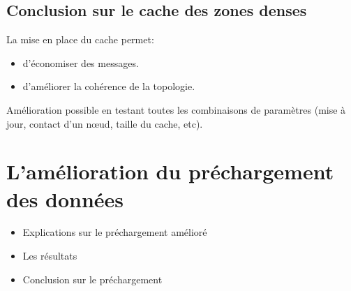 \documentclass{beamer}
\begin{document}
  \subsection{Conclusion sur le cache des zones denses}
  \begin{frame}
  	La mise en place du cache permet:\\
	\begin{itemize}
		\item d'économiser des messages.\\
		\item d'améliorer la cohérence de la topologie.\\
	\end{itemize}
	\vspace{5mm}
	Amélioration possible en testant toutes les combinaisons de paramètres (mise à jour, contact d'un nœud, taille du cache, etc).\\
  \end{frame}



  \section{L'amélioration du préchargement des données}
  \begin{frame}
	\vspace{1cm}
	\begin{itemize}
		\item Explications sur le préchargement amélioré
		\item Les résultats 
		\item Conclusion sur le préchargement
	\end{itemize}
  \end{frame}
\end{document}
